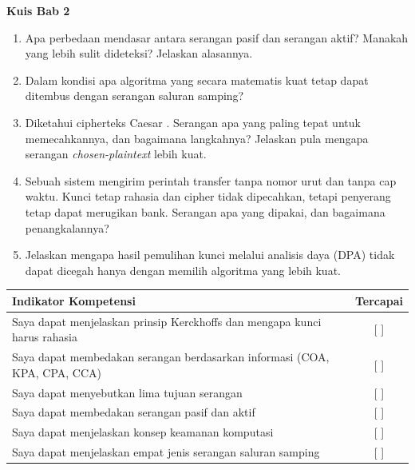 \begin{obeassessment}
\textbf{Kuis Bab 2}
\begin{enumerate}
    \item Apa perbedaan mendasar antara serangan pasif dan serangan aktif?
          Manakah yang lebih sulit dideteksi? Jelaskan alasannya.
    \item Dalam kondisi apa algoritma yang secara matematis kuat tetap dapat
          ditembus dengan serangan saluran samping?
    \item Diketahui cipherteks Caesar . Serangan apa yang paling
          tepat untuk memecahkannya, dan bagaimana langkahnya? Jelaskan pula
          mengapa serangan \textit{chosen-plaintext} lebih kuat.
    \item Sebuah sistem mengirim perintah transfer tanpa nomor urut dan tanpa cap
          waktu. Kunci tetap rahasia dan cipher tidak dipecahkan, tetapi penyerang
          tetap dapat merugikan bank. Serangan apa yang dipakai, dan bagaimana
          penangkalannya?
    \item Jelaskan mengapa hasil pemulihan kunci melalui analisis daya (DPA)
          tidak dapat dicegah hanya dengan memilih algoritma yang lebih kuat.
\end{enumerate}
\end{obeassessment}
\begin{competencychecklist}
\begin{tabularx}{\linewidth}{|X|c|}
\hline
Indikator Kompetensi & Tercapai \\
\hline
Saya dapat menjelaskan prinsip Kerckhoffs dan mengapa kunci harus rahasia & [ ] \\
\hline
Saya dapat membedakan serangan berdasarkan informasi (COA, KPA, CPA, CCA) & [ ] \\
\hline
Saya dapat menyebutkan lima tujuan serangan & [ ] \\
\hline
Saya dapat membedakan serangan pasif dan aktif & [ ] \\
\hline
Saya dapat menjelaskan konsep keamanan komputasi & [ ] \\
\hline
Saya dapat menjelaskan empat jenis serangan saluran samping & [ ] \\
\hline
\end{tabularx}
\end{competencychecklist}
